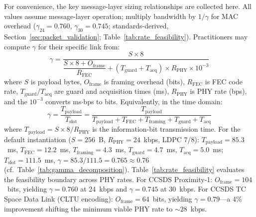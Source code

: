 \documentclass[journal]{IEEEtran}
\begin{document}
For convenience, the key message-layer sizing relationships are collected here. All values assume message-layer operation; multiply bandwidth by $1/\gamma$ for MAC overhead ($\gamma_{24} = 0.760$, $\gamma_{30} = 0.745$; standards-derived, Section~\ref{sec:packet_validation}; Table~\ref{tab:rate_feasibility}). Practitioners may compute $\gamma$ for their specific link from:
\begin{equation}
    \gamma = \frac{S \times 8}{\dfrac{S \times 8 + O_{\text{frame}}}{R_{\text{FEC}}} + (T_{\text{guard}} + T_{\text{acq}}) \times R_{\text{PHY}} \times 10^{-3}}
    \label{eq:gamma_general}
\end{equation}
\noindent where $S$ is payload bytes, $O_{\text{frame}}$ is framing overhead (bits), $R_{\text{FEC}}$ is FEC code rate, $T_{\text{guard}}$/$T_{\text{acq}}$ are guard and acquisition times (ms), $R_{\text{PHY}}$ is PHY rate (bps), and the $10^{-3}$ converts ms$\cdot$bps to bits. Equivalently, in the time domain:
\begin{equation}
    \gamma = \frac{T_{\text{payload}}}{T_{\text{slot}}} = \frac{T_{\text{payload}}}{T_{\text{payload}} + T_{\text{FEC}} + T_{\text{framing}} + T_{\text{guard}} + T_{\text{acq}}}
    \label{eq:gamma_time}
\end{equation}
\noindent where $T_{\text{payload}} = S \times 8 / R_{\text{PHY}}$ is the information-bit transmission time. For the default instantiation ($S = 256$~B, $R_{\text{PHY}} = 24$~kbps, LDPC 7/8): $T_{\text{payload}} = 85.3$~ms, $T_{\text{FEC}} = 12.2$~ms, $T_{\text{framing}} = 4.3$~ms, $T_{\text{guard}} = 4.7$~ms, $T_{\text{acq}} = 5.0$~ms; $T_{\text{slot}} = 111.5$~ms, $\gamma = 85.3/111.5 = 0.765 \approx 0.76$ (cf.\ Table~\ref{tab:gamma_decomposition}). Table~\ref{tab:rate_feasibility} evaluates the feasibility boundary across PHY rates. For CCSDS Proximity-1: $O_{\text{frame}} = 104$~bits, yielding $\gamma = 0.760$ at 24~kbps and $\gamma = 0.745$ at 30~kbps. For CCSDS TC Space Data Link (CLTU encoding): $O_{\text{frame}} = 64$~bits, yielding $\gamma = 0.79$---a 4\% improvement shifting the minimum viable PHY rate to ${\sim}28$~kbps.
\end{document}
